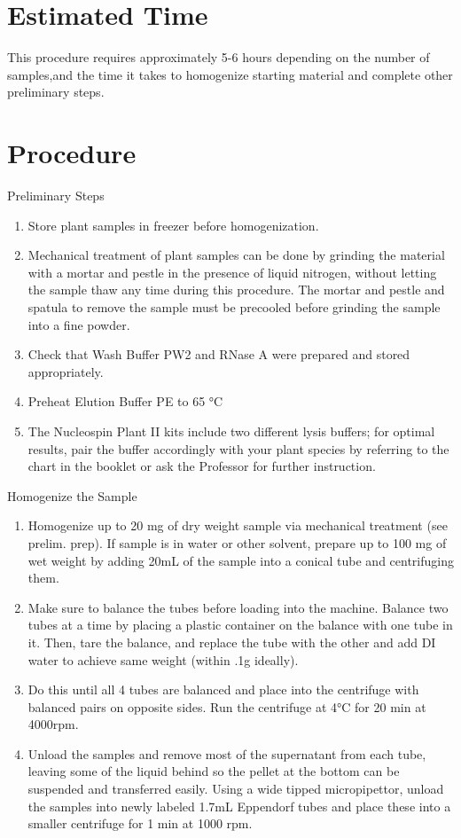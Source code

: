 \documentclass[12pt]{../SOP3_alpha}
\begin{document}
 

\section{Estimated Time}

\NP This procedure requires approximately 5-6 hours depending on the number of samples,and the time it takes to homogenize starting material and complete other preliminary steps. 

\section{Procedure}

\NP Preliminary Steps 
\begin{enumerate}
  \item 	Store plant samples in freezer before homogenization. 
\item Mechanical treatment of plant samples can be done by grinding the material with a mortar and pestle in the presence of liquid nitrogen, without letting the sample thaw any time during this procedure. The mortar and pestle and spatula to remove the sample must be precooled before grinding the sample into a fine powder. 
\item	Check that Wash Buffer PW2 and RNase A were prepared and stored appropriately. 
\item Preheat Elution Buffer PE to 65 °C
\item The Nucleospin Plant II kits include two different lysis buffers; for optimal results, pair the buffer accordingly with your plant species by referring to the chart in the booklet or ask the Professor for further instruction. 

\end{enumerate}



\NP Homogenize the Sample
\begin{enumerate}
  \item Homogenize up to 20 mg of dry weight sample via mechanical treatment (see prelim. prep). If sample is in water or other solvent, prepare up to 100 mg of wet weight by adding 20mL of the sample into a conical tube and centrifuging them. 
  \item Make sure to balance the tubes before loading into the machine. Balance two tubes at a time by placing a plastic container on the balance with one tube in it. Then, tare the balance, and replace the tube with the other and add DI water to achieve same weight (within .1g ideally).
  \item Do this until all 4 tubes are balanced and place into the centrifuge with balanced pairs on opposite sides. Run the centrifuge at 4°C for 20 min at 4000rpm.
  \item Unload the samples and remove most of the supernatant from each tube, leaving some of the liquid behind so the pellet at the bottom can be suspended and transferred easily. Using a wide tipped micropipettor, unload the samples into newly labeled 1.7mL Eppendorf tubes and place these into a smaller centrifuge for 1 min at 1000 rpm.
\end{enumerate}
  
\end{document}
